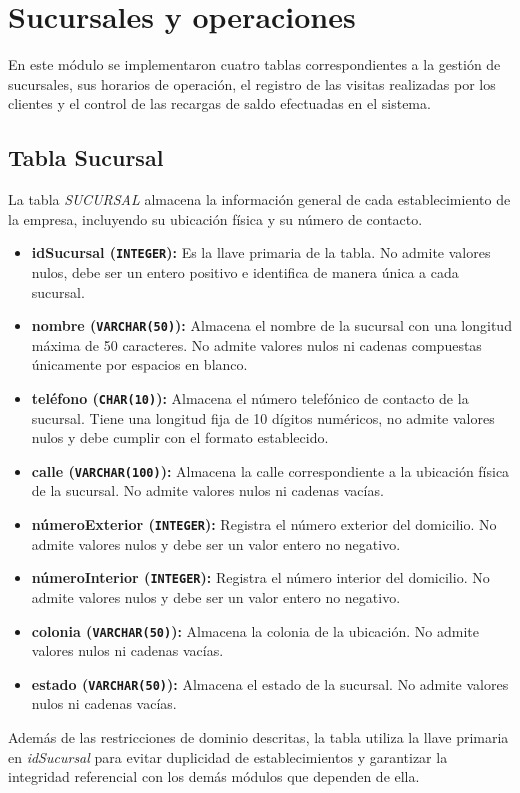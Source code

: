 \section{Sucursales y operaciones}

En este módulo se implementaron cuatro tablas correspondientes a la gestión de sucursales, sus horarios de operación, el registro de las visitas realizadas por los clientes y el control de las recargas de saldo efectuadas en el sistema.
\subsection{Tabla Sucursal} La tabla \textit{SUCURSAL} almacena la información general de cada establecimiento de la empresa, incluyendo su ubicación física y su número de contacto.
\begin{itemize}
    \item \textbf{idSucursal (\texttt{INTEGER}):} Es la llave primaria de la tabla. No admite valores nulos, debe ser un entero positivo e identifica de manera única a cada sucursal.
    \item \textbf{nombre (\texttt{VARCHAR(50)}):} Almacena el nombre de la sucursal con una longitud máxima de 50 caracteres. No admite valores nulos ni cadenas compuestas únicamente por espacios en blanco.
    \item \textbf{teléfono (\texttt{CHAR(10)}):} Almacena el número telefónico de contacto de la sucursal. Tiene una longitud fija de 10 dígitos numéricos, no admite valores nulos y debe cumplir con el formato establecido.
    \item \textbf{calle (\texttt{VARCHAR(100)}):} Almacena la calle correspondiente a la ubicación física de la sucursal. No admite valores nulos ni cadenas vacías.
    \item \textbf{númeroExterior (\texttt{INTEGER}):} Registra el número exterior del domicilio. No admite valores nulos y debe ser un valor entero no negativo.
    \item \textbf{númeroInterior (\texttt{INTEGER}):} Registra el número interior del domicilio. No admite valores nulos y debe ser un valor entero no negativo.
    \item \textbf{colonia (\texttt{VARCHAR(50)}):} Almacena la colonia de la ubicación. No admite valores nulos ni cadenas vacías.
    \item \textbf{estado (\texttt{VARCHAR(50)}):} Almacena el estado de la sucursal. No admite valores nulos ni cadenas vacías.
\end{itemize}
Además de las restricciones de dominio descritas, la tabla utiliza la llave primaria en \textit{idSucursal} para evitar duplicidad de establecimientos y garantizar la integridad referencial con los demás módulos que dependen de ella.

